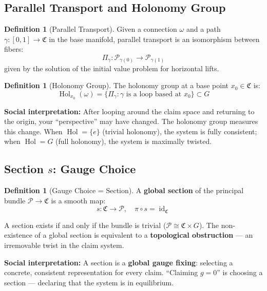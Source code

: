 \documentclass[12pt,a4paper]{article}
\theoremstyle{plain}
\theoremstyle{definition}
\newtheorem{definition}[theorem]{Definition}
\newcommand{\Pcal}{\mathcal{P}}
\newcommand{\conn}{\omega}
\newcommand{\ClaimSpace}{\mathfrak{C}}
\DeclareMathOperator{\Hol}{Hol}
\DeclareMathOperator{\id}{id}
\begin{document}
\subsection{Parallel Transport and Holonomy Group}

\begin{definition}[Parallel Transport]
Given a connection $\conn$ and a path $\gamma: [0,1] \to \ClaimSpace$ in the base manifold,
parallel transport is an isomorphism between fibers:
\begin{equation}
    \Pi_\gamma: \Pcal_{\gamma(0)} \to \Pcal_{\gamma(1)}
\end{equation}
given by the solution of the initial value problem for horizontal lifts.
\end{definition}

\begin{definition}[Holonomy Group]
The holonomy group at a base point $x_0 \in \ClaimSpace$ is:
\begin{equation}
    \Hol_{x_0}(\conn) = \{\Pi_\gamma : \gamma \text{ is a loop based at } x_0\} \subset G
\end{equation}

\textbf{Social interpretation:} After looping around the claim space and returning to the origin, your ``perspective'' may have changed.
The holonomy group measures this change. When $\Hol = \{e\}$ (trivial holonomy), the system is fully consistent;
when $\Hol = G$ (full holonomy), the system is maximally twisted.
\end{definition}

\subsection{Section $s$: Gauge Choice}

\begin{definition}[Gauge Choice = Section]
A \textbf{global section} of the principal bundle $\Pcal \to \ClaimSpace$ is a smooth map:
\begin{equation}
    s: \ClaimSpace \to \Pcal, \quad \pi \circ s = \id_{\ClaimSpace}
\end{equation}

A section exists if and only if the bundle is trivial ($\Pcal \cong \ClaimSpace \times G$).
The non-existence of a global section is equivalent to a \textbf{topological obstruction} — an irremovable twist in the claim system.

\textbf{Social interpretation:} A section is a \textbf{global gauge fixing}: selecting a concrete, consistent representation for every claim. ``Claiming $g=0$'' is choosing a section — declaring that the system is in equilibrium.
\end{definition}
\end{document}
